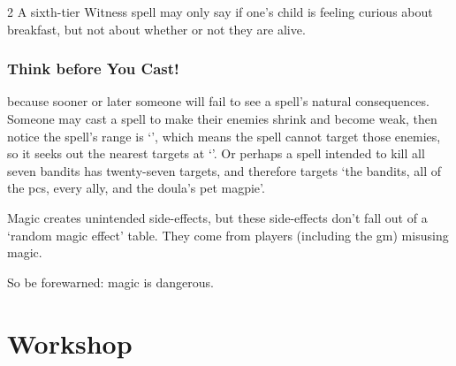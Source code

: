 \begin{multicols}{2}
A sixth-tier Witness spell may only say if one's child is feeling curious about breakfast, but not about whether or not they are alive.

\subsubsection{Think before You Cast!}
because sooner or later someone will fail to see a spell's natural consequences.
Someone may cast a spell to make their enemies shrink and become weak, then notice the spell's range is
\setcounter{spellCost}{4}\setLongRange
`\spellRange', which means the spell cannot target those enemies, so it seeks out the nearest targets at `\spellRange'.
Or perhaps a spell intended to kill all seven bandits has twenty-seven targets, and therefore targets `the bandits, all of the \glspl{pc}, every ally, and the \gls{doula}'s pet magpie'.

Magic creates unintended side-effects, but these side-effects don't fall out of a `random magic effect' table.
They come from players (including the \gls{gm}) misusing magic.

So be forewarned: magic is dangerous.

\end{multicols}

\section{ Workshop}


